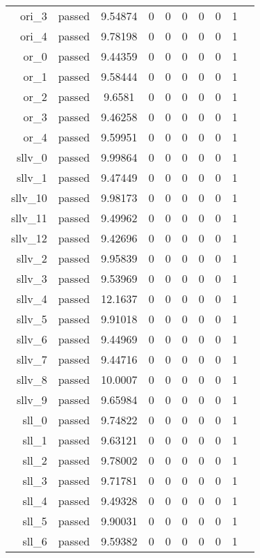 \begin{longtable}{r|ccccccccc}
    ori\_3 & passed & 9.54874 & 0 & 0 & 0 & 0 & 0 & 1 \\
    ori\_4 & passed & 9.78198 & 0 & 0 & 0 & 0 & 0 & 1 \\
    or\_0 & passed & 9.44359 & 0 & 0 & 0 & 0 & 0 & 1 \\
    or\_1 & passed & 9.58444 & 0 & 0 & 0 & 0 & 0 & 1 \\
    or\_2 & passed & 9.6581 & 0 & 0 & 0 & 0 & 0 & 1 \\
    or\_3 & passed & 9.46258 & 0 & 0 & 0 & 0 & 0 & 1 \\
    or\_4 & passed & 9.59951 & 0 & 0 & 0 & 0 & 0 & 1 \\
    sllv\_0 & passed & 9.99864 & 0 & 0 & 0 & 0 & 0 & 1 \\
    sllv\_1 & passed & 9.47449 & 0 & 0 & 0 & 0 & 0 & 1 \\
    sllv\_10 & passed & 9.98173 & 0 & 0 & 0 & 0 & 0 & 1 \\
    sllv\_11 & passed & 9.49962 & 0 & 0 & 0 & 0 & 0 & 1 \\
    sllv\_12 & passed & 9.42696 & 0 & 0 & 0 & 0 & 0 & 1 \\
    sllv\_2 & passed & 9.95839 & 0 & 0 & 0 & 0 & 0 & 1 \\
    sllv\_3 & passed & 9.53969 & 0 & 0 & 0 & 0 & 0 & 1 \\
    sllv\_4 & passed & 12.1637 & 0 & 0 & 0 & 0 & 0 & 1 \\
    sllv\_5 & passed & 9.91018 & 0 & 0 & 0 & 0 & 0 & 1 \\
    sllv\_6 & passed & 9.44969 & 0 & 0 & 0 & 0 & 0 & 1 \\
    sllv\_7 & passed & 9.44716 & 0 & 0 & 0 & 0 & 0 & 1 \\
    sllv\_8 & passed & 10.0007 & 0 & 0 & 0 & 0 & 0 & 1 \\
    sllv\_9 & passed & 9.65984 & 0 & 0 & 0 & 0 & 0 & 1 \\
    sll\_0 & passed & 9.74822 & 0 & 0 & 0 & 0 & 0 & 1 \\
    sll\_1 & passed & 9.63121 & 0 & 0 & 0 & 0 & 0 & 1 \\
    sll\_2 & passed & 9.78002 & 0 & 0 & 0 & 0 & 0 & 1 \\
    sll\_3 & passed & 9.71781 & 0 & 0 & 0 & 0 & 0 & 1 \\
    sll\_4 & passed & 9.49328 & 0 & 0 & 0 & 0 & 0 & 1 \\
    sll\_5 & passed & 9.90031 & 0 & 0 & 0 & 0 & 0 & 1 \\
    sll\_6 & passed & 9.59382 & 0 & 0 & 0 & 0 & 0 & 1 \\

\end{longtable}
